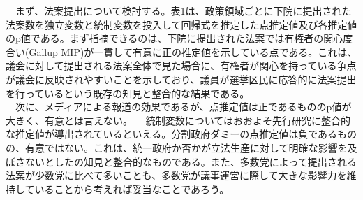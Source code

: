 \documentclass[here]{article}
\begin{document}
　まず、法案提出について検討する。表1は、政策領域ごとに下院に提出された法案数を独立変数と統制変数を投入して回帰式を推定した点推定値及び各推定値のp値である。まず指摘できるのは、下院に提出された法案では有権者の関心度合い(Gallup MIP)が一貫して有意に正の推定値を示している点である。これは、議会に対して提出される法案全体で見た場合に、有権者が関心を持っている争点が議会に反映されやすいことを示しており、議員が選挙区民に応答的に法案提出を行っているという既存の知見と整合的な結果である。\citep*{Page1983-bx,Monroe1998-ty,Burstein2003-vs}\\
　次に、メディアによる報道の効果であるが、点推定値は正であるもののp値が大きく、有意とは言えない。
　統制変数についてはおおよそ先行研究に整合的な推定値が導出されているといえる。分割政府ダミーの点推定値は負であるものの、有意ではない。これは、統一政府か否かが立法生産に対して明確な影響を及ぼさないとした\citet*{Mayhew1991-rq}の知見と整合的なものである。また、多数党によって提出される法案が少数党に比べて多いことも、多数党が議事運営に際して大きな影響力を維持していることから考えれば妥当なことであろう。\citep*{Sinclair2016-kh,Cox2005-pn,Cox2007-xq}
\end{document}
